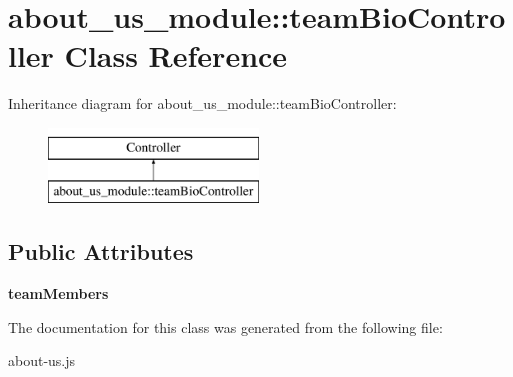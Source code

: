 \hypertarget{classabout__us__module_1_1teamBioController}{\section{about\-\_\-us\-\_\-module\-:\-:team\-Bio\-Controller Class Reference}
\label{classabout__us__module_1_1teamBioController}
}
Inheritance diagram for about\-\_\-us\-\_\-module\-:\-:team\-Bio\-Controller\-:\begin{figure}[H]
\begin{center}
\leavevmode
\includegraphics[height=2.000000cm]{classabout__us__module_1_1teamBioController}
\end{center}
\end{figure}
\subsection*{Public Attributes}
\begin{DoxyCompactItemize}
\item 
\hypertarget{classabout__us__module_1_1teamBioController_a559070080670303b17b2aa55cdd8b5fe}{{\bfseries team\-Members}}\label{classabout__us__module_1_1teamBioController_a559070080670303b17b2aa55cdd8b5fe}

\end{DoxyCompactItemize}


The documentation for this class was generated from the following file\-:\begin{DoxyCompactItemize}
\item 
about-\/us.\-js\end{DoxyCompactItemize}
